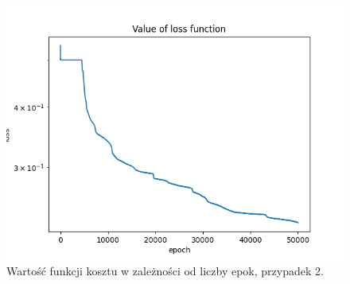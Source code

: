 \documentclass[11pt, leqno]{scrartcl}
\begin{document}
    \begin{figure}[H]
        \centering
        \includegraphics[width=0.7\linewidth]{nn_b1_loss.png}
        \caption{Wartość funkcji kosztu w zależności od liczby epok,
            przypadek 2.}
    \end{figure}
\end{document}
